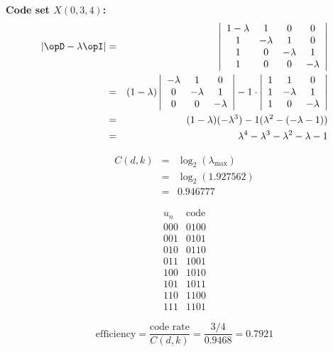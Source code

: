 \begin{example}{\bf Code set $X(0,3,4)$:}
\begin{eqnarray*}
   |\opD-\lambda \opI | 
     &=& \left|
            \begin{array}{*{8}{c}}
               1-\lambda & 1        & 0        & 0 \\
               1        & -\lambda & 1        & 0 \\
               1        & 0        & -\lambda & 1 \\
               1        & 0        & 0        & -\lambda 
            \end{array}
         \right|
   \\&=& (1-\lambda) \left|
            \begin{array}{*{8}{c}}
               -\lambda & 1        & 0 \\
               0        & -\lambda & 1 \\
               0        & 0        & -\lambda 
            \end{array}
         \right|
        -1\cdot\left|
            \begin{array}{*{8}{c}}
               1        & 1        & 0 \\
               1        & -\lambda & 1 \\
               1        & 0        & -\lambda 
            \end{array}
         \right|
   \\&=& (1-\lambda)(-\lambda^3) -1(\lambda^2-(-\lambda-1))
   \\&=& \lambda^4 - \lambda^3 - \lambda^2 - \lambda - 1
\end{eqnarray*}

\begin{eqnarray*}
   C(d,k) 
     &=& \log_2(\lambda_{\mathrm{max}})
   \\&=& \log_2(1.927562)
   \\&=& 0.946777
\end{eqnarray*}



\[
\begin{array}{c|c}
   u_n & \mbox{code} \\
   \hline
   000 & 0100  \\
   001 & 0101  \\
   010 & 0110  \\
   011 & 1001  \\
   100 & 1010  \\
   101 & 1011  \\
   110 & 1100  \\
   111 & 1101
\end{array}
\]

\[
    \mathrm{efficiency} 
      = \frac{\mbox{code rate}}{C(d,k)} 
    = \frac{3/4}{0.9468} 
    = 0.7921
\]


\end{example}


